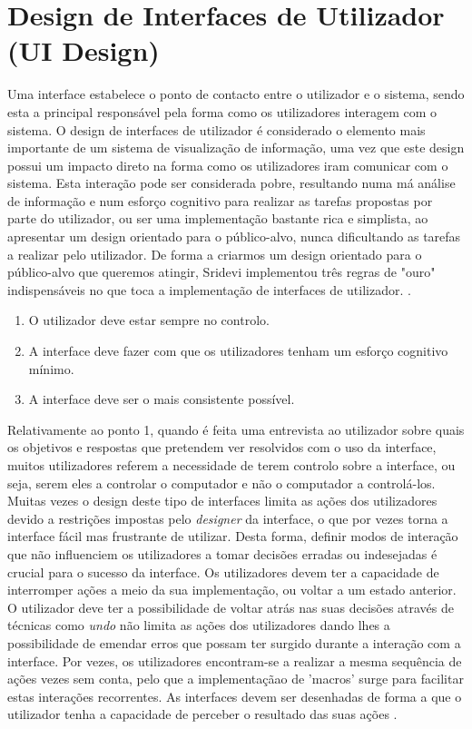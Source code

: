 \section{Design de Interfaces de Utilizador (UI Design)} %
\label{sec:ui_design}

Uma interface estabelece o ponto de contacto entre o utilizador e o sistema, sendo esta a principal responsável pela forma como os utilizadores interagem com o sistema. O design de interfaces de utilizador é considerado o elemento mais importante de um sistema de visualização de informação, uma vez que este design possui um impacto direto na forma como os utilizadores iram comunicar com o sistema. Esta interação pode ser considerada pobre, resultando numa má análise de informação e num esforço cognitivo para realizar as tarefas propostas por parte do utilizador, ou ser uma implementação bastante rica e simplista, ao apresentar um design orientado para o público-alvo, nunca dificultando as tarefas a realizar pelo utilizador. De forma a criarmos um design orientado para o público-alvo que queremos atingir, Sridevi implementou três regras de "ouro" indispensáveis no que toca a implementação de interfaces de utilizador. \cite{sridevi2014user}.

\begin{enumerate}
  \item O utilizador deve estar sempre no controlo.
  \item A interface deve fazer com que os utilizadores tenham um esforço cognitivo mínimo.
  \item A interface deve ser o mais consistente possível.
\end{enumerate}

Relativamente ao ponto 1, quando é feita uma entrevista ao utilizador sobre quais os objetivos e respostas que pretendem ver resolvidos com o uso da interface, muitos utilizadores referem a necessidade de terem controlo sobre a interface, ou seja, serem eles a controlar o computador e não o computador a controlá-los. Muitas vezes o design deste tipo de interfaces limita as ações dos utilizadores devido a restrições impostas pelo \textit{designer} da interface, o que por vezes torna a interface fácil mas frustrante de utilizar. Desta forma, definir modos de interação que não influenciem os utilizadores a tomar decisões erradas ou indesejadas é crucial para o sucesso da interface. Os utilizadores devem ter a capacidade de interromper ações a meio da sua implementação, ou voltar a um estado anterior. O utilizador deve ter a possibilidade de voltar atrás nas suas decisões através de técnicas como \textit{undo} não limita as ações dos utilizadores dando lhes a possibilidade de emendar erros que possam ter surgido durante a interação com a interface. Por vezes, os utilizadores encontram-se a realizar a mesma sequência de ações vezes sem conta, pelo que a implementaçãao de 'macros' surge para facilitar estas interações recorrentes. As interfaces devem ser desenhadas de forma a que o utilizador tenha a capacidade de perceber o resultado das suas ações \cite{sridevi2014user}.

